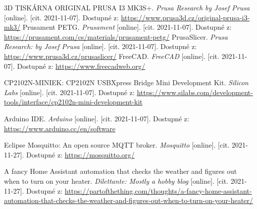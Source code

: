 \begin{thebibliography}{3}
3D TISKÁRNA ORIGINAL PRUSA I3 MK3S+. \textit{Prusa Research by Josef Prusa} [online]. [cit. 2021-11-07]. Dostupné z:  \url{https://www.prusa3d.cz/original-prusa-i3-mk3/}
Prusament PETG. \textit{Prusament} [online]. [cit. 2021-11-07]. Dostupné z: \url{https://prusament.com/cs/materials/prusament-petg/}
PrusaSlicer. \textit{Prusa Research: by Josef Prusa} [online]. [cit. 2021-11-07]. Dostupné z: \url{https://www.prusa3d.cz/prusaslicer/}
FreeCAD. \textit{FreeCAD} [online]. [cit. 2021-11-07]. Dostupné z: \url{https://www.freecadweb.org/}

CP2102N-MINIEK: CP2102N USBXpress Bridge Mini Development Kit. \textit{Silicon Labs} [online]. [cit. 2021-11-07]. Dostupné z: \url{https://www.silabs.com/development-tools/interface/cp2102n-mini-development-kit}


Arduino IDE. \textit{Arduino} [online]. [cit. 2021-11-07]. Dostupné z: \url{https://www.arduino.cc/en/software}

Eclipse Mosquitto: An open source MQTT broker. \textit{Mosquitto} [online]. [cit. 2021-11-27]. Dostupné z: \url{https://mosquitto.org/}

A fancy Home Assistant automation that checks the weather and figures out when to turn on your heater. \textit{Dilettante: Mostly a hobby blog} [online]. [cit. 2021-11-27]. Dostupné z: \url{https://partofthething.com/thoughts/a-fancy-home-assistant-automation-that-checks-the-weather-and-figures-out-when-to-turn-on-your-heater/}


\end{thebibliography}